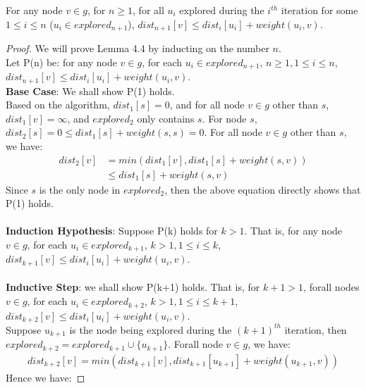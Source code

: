 \begin{sublemma}\label{lemma4.4}
For any node $v \in g$, for $n \geq 1$, for all $u_i$ explored during the $i^{th}$ iteration for some $1 \leq i \leq n$ ($u_i \in explored_{n+1}$), $dist_{n+1}[v] \leq dist_i[u_i] + weight(u_i, v)$. 
\end{sublemma}
\begin{proof}
We will prove Lemma 4.4 by inducting on the number $n$. 
\\
Let P(n) be: for any node $v \in g$, for each $u_i \in explored_{n+1}$, $n \geq 1, 1 \leq i \leq n$, $dist_{n+1}[v] \leq dist_i[u_i] + weight(u_i, v)$. 
\\
\textbf{Base Case}: We shall show P(1) holds. 
\\
Based on the algorithm, $dist_1[s] = 0$, and for all node $v \in g$ other than $s$, $dist_1[v] = \infty$, and $explored_2$ only contains $s$. For node $s$, $dist_2[s] = 0 \leq dist_1[s] + weight(s, s) = 0$. For all node $v \in g$ other than $s$, we have: 
\begin{align*}
      dist_2[v] &= min(dist_1[v], dist_1[s] + weight(s, v)) \\
                &\leq dist_1[s] + weight(s, v)
\end{align*}
Since $s$ is the only node in $explored_2$, then the above equation directly shows that P(1) holds. 
\\\\
\textbf{Induction Hypothesis}: Suppose P(k) holds for $k > 1$. That is, for any node $v \in g$, for each $u_i \in explored_{k+1}$, $k > 1, 1 \leq i \leq k$, $dist_{k+1}[v] \leq dist_i[u_i] + weight(u_i, v)$. 
\\\\
\textbf{Inductive Step}: we shall show P(k+1) holds. That is,  for $k+1 > 1$, forall nodes $v \in g$,  for each $u_i \in explored_{k+2}$, $k > 1, 1 \leq i \leq k+1$, $dist_{k+2}[v] \leq dist_i[u_i] + weight(u_i, v)$. 
\\
Suppose $u_{k+1}$ is the node being explored during the $(k+1)^{th}$ iteration, then $explored_{k+2} = explored_{k+1} \cup \{u_{k+1}\}$. Forall node $v \in g$, we have: 
\begin{align*}
  dist_{k+2}[v] = min(dist_{k+1}[v], dist_{k+1}[u_{k+1}] + weight(u_{k+1}, v))
\end{align*}
Hence we have: 

\end{proof}
